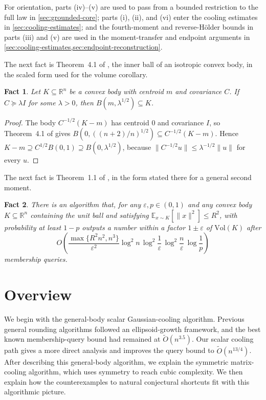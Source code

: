 \documentclass[11pt]{article}
\numberwithin{equation}{section}
\newtheorem{fact}[fact]{Fact}
\theoremstyle{definition}
\newcommand{\eps}{\varepsilon}
\newcommand{\R}{\mathbb{R}}
\newcommand{\Vol}{\mathrm{Vol}}
\renewcommand{\O}{\widetilde{O}}
\newcommand{\E}[2]{\mathbb{E}_{#1}\left[#2\right]}
\begin{document}
For orientation, parts (iv)--(v) are used to pass from a bounded restriction to
the full law in \cref{sec:grounded-core}; parts (i), (ii), and (vi) enter the
cooling estimates in \cref{sec:cooling-estimates}; and the fourth-moment and
reverse-H\"older bounds in parts (iii) and (v) are used in the moment-transfer
and endpoint arguments in
\cref{sec:cooling-estimates,sec:endpoint-reconstruction}.

The next fact is Theorem~4.1 of \cite{KLS95:journal}, the inner ball of an
isotropic convex body, in the scaled form used for the volume corollary.

\begin{fact}
\label{fact:kls-inner-ball}
Let $K\subseteq\R^n$ be a convex body with centroid
$m$ and covariance
$C$.
If $C\succeq\lambda I$ for some
$\lambda>0$, then
$B(m,\lambda^{1/2})\subseteq K$.
\end{fact}

\begin{proof}
The body $C^{-1/2}(K-m)$ has centroid
$0$ and covariance
$I$, so Theorem~4.1 of \cite{KLS95:journal} gives
$B(0,((n+2)/n)^{1/2})\subseteq C^{-1/2}(K-m)$.
Hence $K-m\supseteq C^{1/2}B(0,1)\supseteq B(0,\lambda^{1/2})$, because
$\|C^{-1/2}u\|\leq\lambda^{-1/2}\|u\|$ for every
$u$.
\end{proof}

The next fact is Theorem~1.1 of \cite{CV18:journal}, in the form stated there
for a general second moment.

\begin{fact}
\label{fact:cv18-volume}
There is an algorithm that, for any $\eps,p\in(0,1)$ and any convex body
$K\subseteq\R^n$ containing the unit ball and satisfying
$\E{x\sim K}{\|x\|^2}\leq R^2$, with probability at least
$1-p$ outputs a number within a factor
$1\pm\eps$ of
$\Vol(K)$ after
\[
O\left(\frac{\max\{R^2n^2,n^3\}}{\eps^2}
\log^2n\,\log^2\frac1\eps\,\log^2\frac n\eps\,\log\frac1p\right)
\]
membership queries.
\end{fact}

\section{Overview}
\label{sec:overview}

We begin with the general-body scalar Gaussian-cooling algorithm.
Previous general rounding algorithms followed an ellipsoid-growth framework, and
the best known membership-query bound had remained at $\O(n^{3.5})$.
Our scalar cooling path gives a more direct analysis and improves the query
bound to $\O(n^{13/4})$.
After describing this general-body algorithm, we explain the symmetric
matrix-cooling algorithm, which uses symmetry to reach cubic complexity.
We then explain how the counterexamples to natural conjectural shortcuts fit
with this algorithmic picture.
\end{document}
